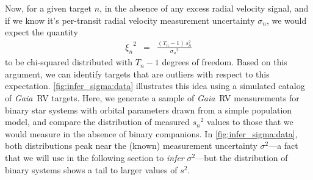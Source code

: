 \documentclass[modern, letterpaper]{aastex631}
\newcommand{\project}[1]{\textsl{#1}}
\newcommand{\Gaia}{\project{Gaia}}
\begin{document}
Now, for a given target $n$, in the absence of any excess radial velocity signal, and if we know it's per-transit radial velocity measurement uncertainty $\sigma_n$, we would expect the quantity
\begin{eqnarray}
	{\xi_n}^2 &=& \frac{(T_n - 1)\,s_n^2}{{\sigma_n}^2}
	\label{eq:chi-sq-samp}
\end{eqnarray}
to be chi-squared distributed with $T_n - 1$ degrees of freedom.
Based on this argument, we can identify targets that are outliers with respect to this expectation.
\autoref{fig:infer_sigma:data} illustrates this idea using a simulated catalog of \Gaia\ RV targets.
Here, we generate a sample of \Gaia\ RV measurements for binary star systems with orbital parameters drawn from a simple population model, and compare the distribution of measured ${s_n}^2$ values to those that we would measure in the absence of binary companions.
In \autoref{fig:infer_sigma:data}, both distributions peak near the (known) measurement uncertainty $\sigma^2$---a fact that we will use in the following section to \emph{infer} $\sigma^2$---but the distribution of binary systems shows a tail to larger values of $s^2$.
\end{document}
